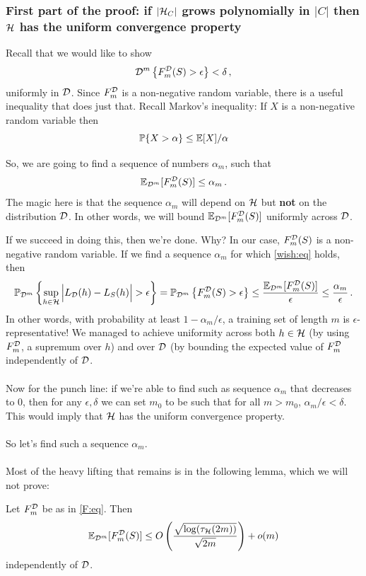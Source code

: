 \subsubsection{First part of the proof: 
if 
\bf $|\mathcal{H}_C|$ grows polynomially in $|C|$ then
  $\mathcal{H}$ has the uniform convergence property}

Recall that we would like to show
\[
  \mathcal{D}^m\left\{ F_m^{\mathcal{D}}(S)>\epsilon \right\} < \delta\,,
\]
uniformly in $\mathcal{D}$.
Since $F^{\mathcal{D}}_m$ is a non-negative random variable, there is a useful inequality
that does just that. Recall Markov's inequality:
If $X$ is a non-negative random variable then 
\[
    \mathbb{P}\{X>\alpha\}\leq \mathbb{E}[X]/\alpha
\]

So, we are going to find a sequence of numbers $\alpha_m$,
such that 
\begin{eqnarray} \label{wish:eq}
    \mathbb{E}_{\mathcal{D}^m}[F^{\mathcal{D}}_m(S)] \leq \alpha_m \,.
\end{eqnarray}
The magic here is that the sequence $\alpha_m$ will depend on $\mathcal{H}$ but {\bf
not} on the distribution $\mathcal{D}$. In other words, we will bound
$\mathbb{E}_{\mathcal{D}^m}[F^{\mathcal{D}}_m(S)]$ uniformly across $\mathcal{D}$. 

If we succeed in doing this, then we're done. Why?
In our case, $F^{\mathcal{D}}_m(S)$ is a non-negative random variable. If we find a sequence
$\alpha_m$ for which 
\eqref{wish:eq} holds, then
\[
    \mathbb{P}_{\mathcal{D}^m} \left\{  \sup_{h\in\mathcal{H}} \Big| L_{\mathcal{D}}(h) - L_S(h) \Big| >
    \epsilon \right\} =
    \mathbb{P}_{\mathcal{D}^m} \left\{ F^{\mathcal{D}}_m(S)>\epsilon \right\} \leq 
    \frac{\mathbb{E}_{\mathcal{D}^m}[F^{\mathcal{D}}_m(S)]}{ \epsilon} \leq \frac{\alpha_m}{\epsilon}\,.
\]
In other words, with probability at least $1-\alpha_m/\epsilon$, a training set
of length $m$ is $\epsilon$-representative! We managed to achieve uniformity
across both $h\in\mathcal{H}$ (by using $F^{\mathcal{D}}_m$, a supremum over $h$) and over $\mathcal{D}$
(by bounding the expected value of $F^{\mathcal{D}}_m$ independently of $\mathcal{D}$. 
\\~\\
Now for the punch line: if we're able to find such as sequence $\alpha_m$ that
decreases to $0$, then for any $\epsilon,\delta$ we can set $m_0$ to be such that for
all $m>m_0$, $\alpha_m/\epsilon<\delta$. This would imply that $\mathcal{H}$ has the
uniform convergence property.
\\~\\
So let's find such a sequence $\alpha_m$. 
\\~\\
Most of the heavy lifting that remains is in the following lemma, which we will
not prove:
\begin{lemma} \label{F:lem}
    Let $F_m^{\mathcal{D}}$ be as in \eqref{F:eq}.    Then
    \[
        \mathbb{E}_{\mathcal{D}^m} [F_m^{\mathcal{D}}(S)] \leq  
        O\left(\frac{ \sqrt{\log(\tau_{\mathcal{H}}(2m))}} {\sqrt{2m}}\right) +o(m)
    \]
    independently of $\mathcal{D}$.
\end{lemma}

